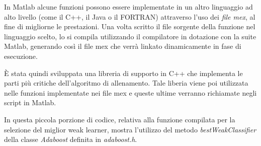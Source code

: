         In Matlab alcune funzioni possono essere implementate in un altro linguaggio ad alto livello (come il C++, il Java o il FORTRAN) attraverso l'uso dei \emph{file mex}, al fine di migliorne le prestazioni.
        Una volta scritto il file sorgente della funzione nel linguaggio scelto, lo si compila utilizzando il compilatore in dotazione con la suite Matlab, generando così il file mex che verrà linkato dinamicamente in fase di esecuzione.

        È stata quindi sviluppata una libreria di supporto in C++ che implementa le parti più critiche dell'algoritmo di allenamento.
        Tale liberia viene poi utilizzata nelle funzioni implementate nei file mex e queste ultime verranno richiamate negli script in Matlab.

        

        In questa piccola porzione di codice, relativa alla funzione compilata per la selezione del miglior weak learner, mostra l'utilizzo del metodo \emph{bestWeakClassifier} della classe \emph{Adaboost} definita in \emph{adaboost.h}.